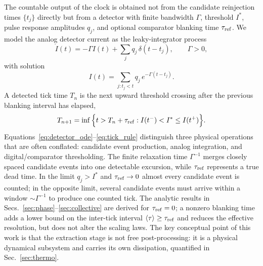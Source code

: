 \documentclass[aps,pre,reprint,amsmath,amssymb,floatfix,nofootinbib]{revtex4-2}
\newcommand{\avg}[1]{\langle #1 \rangle}
\begin{document}
The countable output of the clock is obtained not from the candidate
reinjection times $\{t_j\}$ directly but from a detector with finite
bandwidth $\Gamma$, threshold $I^\ast$, pulse response amplitudes $q_j$,
and optional comparator blanking time $\tau_{\rm ref}$. We model the
analog detector current as the leaky-integrator process
\begin{equation}
  \dot I(t)=-\Gamma I(t)+\sum_j q_j\,\delta(t-t_j),
  \qquad \Gamma>0,
  \label{eq:detector_ode}
\end{equation}
with solution
\begin{equation}
  I(t)=\sum_{j:t_j<t}q_j\,e^{-\Gamma(t-t_j)} .
  \label{eq:detector_solution}
\end{equation}
A detected tick time $T_n$ is the next upward threshold crossing after
the previous blanking interval has elapsed,
\begin{equation}
  T_{n+1}=\inf\Big\{t>T_n+\tau_{\rm ref}:
  I(t^-)<I^\ast\le I(t^+)\Big\} .
  \label{eq:tick_rule}
\end{equation}
Equations~\eqref{eq:detector_ode}--\eqref{eq:tick_rule} distinguish
three physical operations that are often conflated: candidate event
production, analog integration, and digital/comparator thresholding. The
finite relaxation time $\Gamma^{-1}$ merges closely spaced candidate
events into one detectable excursion, while $\tau_{\rm ref}$ represents a
true dead time. In the limit $q_j>I^\ast$ and $\tau_{\rm ref}\to0$ almost
every candidate event is counted; in the opposite limit, several
candidate events must arrive within a window $\sim\Gamma^{-1}$ to produce
one counted tick. The analytic results in Secs.~\ref{sec:phase}--\ref{sec:collective}
are derived for $\tau_{\rm ref}=0$; a nonzero blanking time adds a
lower bound on the inter-tick interval $\avg{\tau}\ge\tau_{\rm ref}$ and
reduces the effective resolution, but does not alter the scaling laws. The
key conceptual point of this work is that the extraction stage is not free
post-processing: it is a physical dynamical subsystem and carries its own
dissipation, quantified in Sec.~\ref{sec:thermo}.
\end{document}

